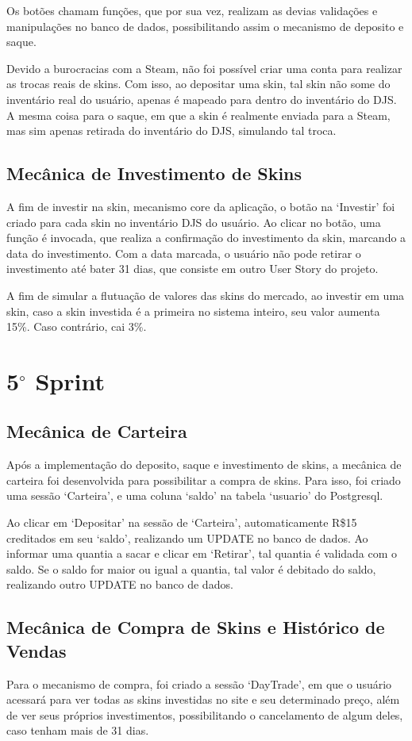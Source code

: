 Os botões chamam funções, que por sua vez, realizam as devias validações e manipulações no banco 
de dados, possibilitando assim o mecanismo de deposito e saque.

Devido a burocracias com a Steam, não foi possível criar uma conta para realizar as trocas reais 
de skins. Com isso, ao depositar uma skin, tal skin não some do inventário real do usuário, 
apenas é mapeado para dentro do inventário do DJS. A mesma coisa para o saque, em que a 
skin é realmente enviada para a Steam, mas sim apenas retirada do inventário do DJS, 
simulando tal troca.

\subsection{Mecânica de Investimento de Skins}
A fim de investir na skin, mecanismo core da aplicação, o botão na ‘Investir’ foi criado 
para cada skin no inventário DJS do usuário. Ao clicar no botão, uma função é invocada, 
que realiza a confirmação do investimento da skin, marcando a data do investimento.
Com a data marcada, o usuário não pode retirar o investimento até bater 31 dias, que 
consiste em outro User Story do projeto.

A fim de simular a flutuação de valores das skins do mercado, ao investir em uma skin, 
caso a skin investida é a primeira no sistema inteiro, seu valor aumenta 
15\%. Caso contrário, cai 3\%.

\section{5$^{\circ}$ Sprint}
\subsection{Mecânica de Carteira}
Após a implementação do deposito, saque e investimento de skins, a mecânica de carteira foi 
desenvolvida para possibilitar a compra de skins. Para isso, foi criado uma sessão ‘Carteira’, e 
uma coluna ‘saldo’ na tabela ‘usuario’ do Postgresql. 

Ao clicar em ‘Depositar’ na sessão de ‘Carteira’, automaticamente R\$15 creditados em seu ‘saldo’, 
realizando um UPDATE no banco de dados. Ao informar uma quantia a sacar e clicar em ‘Retirar’, tal 
quantia é validada com o saldo. Se o saldo for maior ou igual a quantia, tal valor é debitado do 
saldo, realizando outro UPDATE no banco de dados.

\subsection{Mecânica de Compra de Skins e Histórico de Vendas}
Para o mecanismo de compra, foi criado a sessão ‘DayTrade’, em que o usuário 
acessará para ver todas as skins investidas no site e seu determinado preço, além 
de ver seus próprios investimentos, possibilitando o cancelamento de algum deles, 
caso tenham mais de 31 dias.

